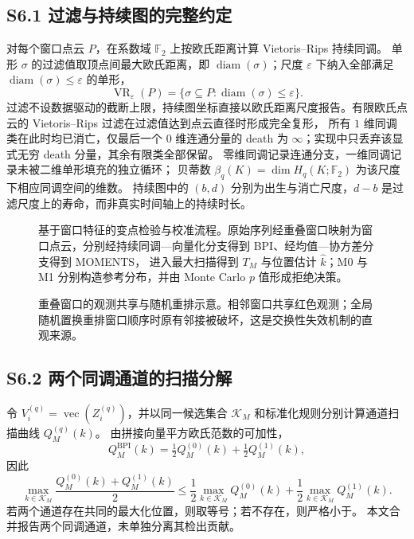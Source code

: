 \documentclass[UTF8,zihao=-4]{ctexart}
\theoremstyle{remark}
\begin{document}
\subsection*{S6.1 过滤与持续图的完整约定}
对每个窗口点云 $P$，在系数域 $\mathbb F_2$ 上按欧氏距离计算 Vietoris--Rips 持续同调。
单形 $\sigma$ 的过滤值取顶点间最大欧氏距离，即 $\operatorname{diam}(\sigma)$；尺度 $\varepsilon$ 下纳入全部满足
$\operatorname{diam}(\sigma)\le\varepsilon$ 的单形，
\[
 \operatorname{VR}_\varepsilon(P)=\{\sigma\subseteq P:\operatorname{diam}(\sigma)\le\varepsilon\}.
\]
过滤不设数据驱动的截断上限，持续图坐标直接以欧氏距离尺度报告。有限欧氏点云的 Vietoris--Rips 过滤在过滤值达到点云直径时形成完全复形，
所有 $1$ 维同调类在此时均已消亡，仅最后一个 $0$ 维连通分量的 death 为 $\infty$；实现中只丢弃该显式无穷 death 分量，其余有限类全部保留。
零维同调记录连通分支，一维同调记录未被二维单形填充的独立循环；
贝蒂数 $\beta_q(K)=\dim H_q(K;\mathbb F_2)$ 为该尺度下相应同调空间的维数。
持续图中的 $(b,d)$ 分别为出生与消亡尺度，$d-b$ 是过滤尺度上的寿命，而非真实时间轴上的持续时长。

\begin{figure}[ht]
\centering
\resizebox{0.98\textwidth}{!}{}
\caption{基于窗口特征的变点检验与校准流程。原始序列经重叠窗口映射为窗口点云，分别经持续同调—向量化分支得到 BPI、经均值—协方差分支得到 MOMENTS，
进入最大扫描得到 $T_M$ 与位置估计 $\hat k$；M0 与 M1 分别构造参考分布，并由 Monte Carlo $p$ 值形成拒绝决策。}\label{fig:s6-flow}
\end{figure}

\begin{figure}[ht]
\centering
\resizebox{0.86\textwidth}{!}{}
\caption{重叠窗口的观测共享与随机重排示意。相邻窗口共享红色观测；全局随机置换重排窗口顺序时原有邻接被破坏，这是交换性失效机制的直观来源。}\label{fig:s6-overlap}
\end{figure}

\subsection*{S6.2 两个同调通道的扫描分解}
令 $V_i^{(q)}=\operatorname{vec}(Z_i^{(q)})$，并以同一候选集合 $\mathcal K_M$ 和标准化规则分别计算通道扫描曲线 $Q_M^{(q)}(k)$。
由拼接向量平方欧氏范数的可加性，
\[
 Q_M^{\mathrm{BPI}}(k)=\tfrac12 Q_M^{(0)}(k)+\tfrac12 Q_M^{(1)}(k),
\]
因此
\[
 \max_{k\in\mathcal K_M}\frac{Q_M^{(0)}(k)+Q_M^{(1)}(k)}{2}
 \le
 \frac12\max_{k\in\mathcal K_M}Q_M^{(0)}(k)
 +\frac12\max_{k\in\mathcal K_M}Q_M^{(1)}(k).
\]
若两个通道存在共同的最大化位置，则取等号；若不存在，则严格小于。
本文合并报告两个同调通道，未单独分离其检出贡献。
\end{document}
